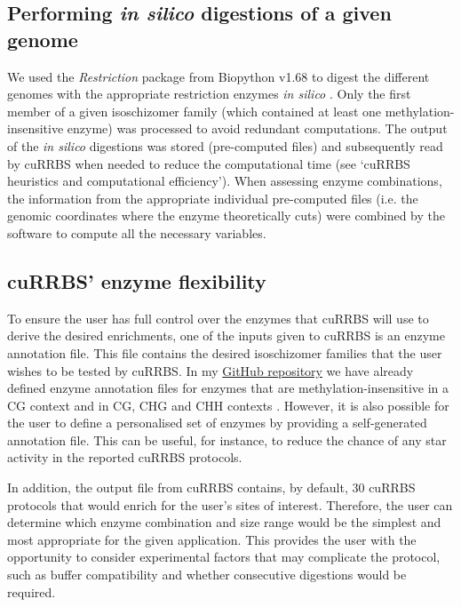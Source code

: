 \subsection*{Performing \textit{in silico} digestions of a given genome}

We used the \textit{Restriction} package from Biopython v1.68 to digest the different genomes with the appropriate restriction enzymes \textit{in silico} \cite{Cock2009}. Only the first member of a given isoschizomer family (which contained at least one methylation-insensitive enzyme) was processed to avoid redundant computations. The output of the \textit{in silico} digestions was stored (pre-computed files) and subsequently read by cuRRBS when needed to reduce the computational time (see `cuRRBS heuristics and computational efficiency'). When assessing enzyme combinations, the information from the appropriate individual pre-computed files (i.e. the genomic coordinates where the enzyme theoretically cuts) were combined by the software to compute all the necessary variables.

\subsection*{cuRRBS' enzyme flexibility}

To ensure the user has full control over the enzymes that cuRRBS will use to derive the desired enrichments, one of the inputs given to cuRRBS is an enzyme annotation file. This file contains the desired isoschizomer families that the user wishes to be tested by cuRRBS. In my \href{https://github.com/demh/cuRRBS/tree/master/utils}{GitHub repository} we have already defined enzyme annotation files for enzymes that are methylation-insensitive in a CG context and in CG, CHG and CHH contexts \cite{Martin-Herranz2017}. However, it is also possible for the user to define a personalised set of enzymes by providing a self-generated annotation file. This can be useful, for instance, to reduce the chance of any star activity in the reported cuRRBS protocols.

\bigskip

In addition, the output file from cuRRBS contains, by default, 30 cuRRBS protocols that would enrich for the user's sites of interest. Therefore, the user can determine which enzyme combination and size range would be the simplest and most appropriate for the given application. This provides the user with the opportunity to consider experimental factors that may complicate the protocol, such as buffer compatibility and whether consecutive digestions would be required.

